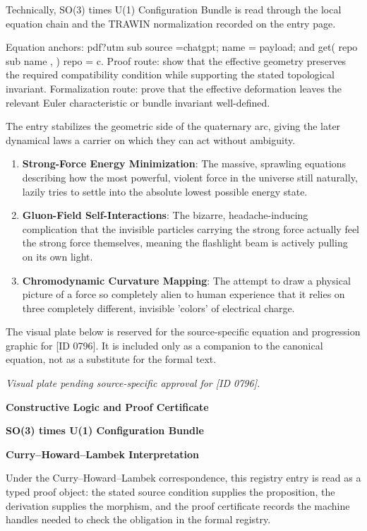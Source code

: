 Technically, SO(3) times U(1) Configuration Bundle is read through the local equation chain and the TRAWIN normalization recorded on the entry page.

Equation anchors: pdf?utm sub source =chatgpt; name = payload; and get( repo sub name , ) repo = c. Proof route: show that the effective geometry preserves the required compatibility condition while supporting the stated topological invariant. Formalization route: prove that the effective deformation leaves the relevant Euler characteristic or bundle invariant well-defined.

The entry stabilizes the geometric side of the quaternary arc, giving the later dynamical laws a carrier on which they can act without ambiguity.
\endgroup

\begin{enumerate}[leftmargin=1.6em,itemsep=6pt,topsep=4pt]
\item \textbf{Strong-Force Energy Minimization}: The massive, sprawling equations describing how the most powerful, violent force in the universe still naturally, lazily tries to settle into the absolute lowest possible energy state.
\item \textbf{Gluon-Field Self-Interactions}: The bizarre, headache-inducing complication that the invisible particles carrying the strong force actually feel the strong force themselves, meaning the flashlight beam is actively pulling on its own light.
\item \textbf{Chromodynamic Curvature Mapping}: The attempt to draw a physical picture of a force so completely alien to human experience that it relies on three completely different, invisible 'colors' of electrical charge.
\end{enumerate}

\begingroup\footnotesize\sloppy
The visual plate below is reserved for the source-specific equation and progression graphic for [ID 0796]. It is included only as a companion to the canonical equation, not as a substitute for the formal text.
\par\endgroup
\begingroup\footnotesize\itshape
Visual plate pending source-specific approval for [ID 0796].
\par\endgroup

\clearpage
\begingroup\tzpsupportsetup
\noindent\textbf{\fontsize{10.8pt}{12.8pt}\selectfont [ID 0796] Constructive Logic and Proof Certificate}\par
\noindent\textbf{\fontsize{10pt}{12pt}\selectfont SO(3) times U(1) Configuration Bundle}\par
\vspace{0.45em}
\begingroup
\footnotesize
\setlength{\parskip}{0.22em}
\setlength{\parindent}{0pt}
\noindent\textbf{Curry--Howard--Lambek Interpretation}\par
Under the Curry--Howard--Lambek correspondence, this registry entry is read as a typed proof
object: the stated source condition supplies the proposition, the derivation supplies the
morphism, and the proof certificate records the machine handles needed to check the obligation
in the formal registry.

